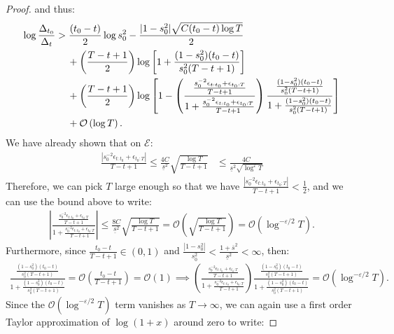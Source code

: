 \begin{proof}
and thus:
\begin{align}
    \log \frac{\Delta_{t_0}}{\Delta_t} &> \frac{(t_0-t)}{2}\log s_0^2  - \frac{|1 - s_0^2|\sqrt{C(t_0-t)\log T}}{2} \notag \\
    &\quad\: + \left(\frac{T - t +1}{2}\right)\log\left[1 + \frac{(1 - s_0^2)(t_0 - t)}{s_0^{2}(T-t+1)}\right] \notag \\
    &\quad\: + \left(\frac{T - t +1}{2}\right)\log\left[1 - \left(\frac{\frac{s_0^{-2}\epsilon_{t:t_0} + \epsilon_{t_0:T}}{T-t+1}}{1 + \frac{s_0^{-2}\epsilon_{t:t_0} + \epsilon_{t_0:T}}{T-t+1}}\right)\frac{\frac{(1 - s_0^2)(t_0 - t)}{s_0^{2}(T-t+1)}}{1 + \frac{(1 - s_0^2)(t_0 - t)}{s_0^{2}(T-t+1)}}\right]  \notag \\
    &\quad\: + \mathcal{O}\left(\log T\right). \label{eq:thm3-cs2-bd3}
\end{align}
We have already shown that on $\mathcal{E}$: 
\begin{align*}
    \frac{|s_0^{-2} \epsilon_{t:t_0} + \epsilon_{t_0:T}|}{T-t+1} \leq \frac{4C}{\underline{s}^{2}}\sqrt{\frac{\log T}{T-t+1}} &\leq \frac{4C}{\underline{s}^2\sqrt{\log^{\varepsilon} T}}
\end{align*}
Therefore, we can pick $T$ large enough so that we have $ \frac{|s_0^{-2} \epsilon_{t:t_0} + \epsilon_{t_0:T}|}{T-t+1}  < \frac{1}{2}$, and we can use the bound above to write: 
\begin{align*}
    \left|\frac{\frac{s_0^{-2}\epsilon_{t:t_0} + \epsilon_{t_0:T}}{T-t+1}}{1 + \frac{s_0^{-2}\epsilon_{t:t_0} + \epsilon_{t_0:T}}{T-t+1}}\right| \leq  \frac{8C}{\underline{s}^{2}}\sqrt{\frac{\log T}{T-t+1}} = \mathcal{O}\left(\sqrt{\frac{\log T}{T-t+1}}\right) = \mathcal{O}(\log^{-\varepsilon/2} T) .
\end{align*}
Furthermore, since $\frac{t_0 - t}{T-t+1} \in (0,1)$ and $\frac{|1-s_0^2|}{s_0^2} < \frac{1+\overline{s}^2}{\underline{s}^2} < \infty$, then:
\small
\begin{align*}
     \frac{\frac{(1 - s_0^2)(t_0 - t)}{s_0^{2}(T-t+1)}}{1 + \frac{(1 - s_0^2)(t_0 - t)}{s_0^{2}(T-t+1)}} = \mathcal{O}\left(\frac{t_0-t}{T-t+1}\right) = \mathcal{O}(1) \implies \left(\frac{\frac{s_0^{-2}\epsilon_{t:t_0} + \epsilon_{t_0:T}}{T-t+1}}{1 + \frac{s_0^{-2}\epsilon_{t:t_0} + \epsilon_{t_0:T}}{T-t+1}}\right)\frac{\frac{(1 - s_0^2)(t_0 - t)}{s_0^{2}(T-t+1)}}{1 + \frac{(1 - s_0^2)(t_0 - t)}{s_0^{2}(T-t+1)}} = \mathcal{O}(\log^{-\varepsilon/2} T).
\end{align*}
\normalsize
Since the $\mathcal{O}(\log^{-\varepsilon/2} T)$ term vanishes as $T \to \infty$, we can again use a first order Taylor approximation of $\log(1+x)$ around zero to write:

\end{proof}
